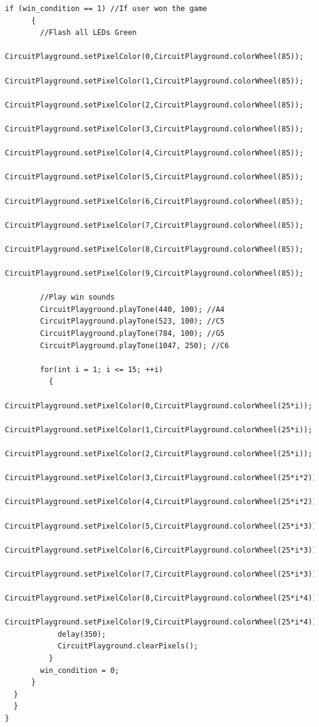 \documentclass[12pt]{article}
\begin{document}
\begin{lstlisting}[language=Arduino]
    if (win_condition == 1) //If user won the game
      {
        //Flash all LEDs Green
        CircuitPlayground.setPixelColor(0,CircuitPlayground.colorWheel(85));
        CircuitPlayground.setPixelColor(1,CircuitPlayground.colorWheel(85));
        CircuitPlayground.setPixelColor(2,CircuitPlayground.colorWheel(85));
        CircuitPlayground.setPixelColor(3,CircuitPlayground.colorWheel(85));
        CircuitPlayground.setPixelColor(4,CircuitPlayground.colorWheel(85));
        CircuitPlayground.setPixelColor(5,CircuitPlayground.colorWheel(85));
        CircuitPlayground.setPixelColor(6,CircuitPlayground.colorWheel(85));
        CircuitPlayground.setPixelColor(7,CircuitPlayground.colorWheel(85));
        CircuitPlayground.setPixelColor(8,CircuitPlayground.colorWheel(85));
        CircuitPlayground.setPixelColor(9,CircuitPlayground.colorWheel(85));

        //Play win sounds
        CircuitPlayground.playTone(440, 100); //A4
        CircuitPlayground.playTone(523, 100); //C5
        CircuitPlayground.playTone(784, 100); //G5
        CircuitPlayground.playTone(1047, 250); //C6

        for(int i = 1; i <= 15; ++i)
          {
            CircuitPlayground.setPixelColor(0,CircuitPlayground.colorWheel(25*i));
            CircuitPlayground.setPixelColor(1,CircuitPlayground.colorWheel(25*i));
            CircuitPlayground.setPixelColor(2,CircuitPlayground.colorWheel(25*i));
            CircuitPlayground.setPixelColor(3,CircuitPlayground.colorWheel(25*i*2));
            CircuitPlayground.setPixelColor(4,CircuitPlayground.colorWheel(25*i*2));
            CircuitPlayground.setPixelColor(5,CircuitPlayground.colorWheel(25*i*3));
            CircuitPlayground.setPixelColor(6,CircuitPlayground.colorWheel(25*i*3));
            CircuitPlayground.setPixelColor(7,CircuitPlayground.colorWheel(25*i*3));
            CircuitPlayground.setPixelColor(8,CircuitPlayground.colorWheel(25*i*4));
            CircuitPlayground.setPixelColor(9,CircuitPlayground.colorWheel(25*i*4));
            delay(350);
            CircuitPlayground.clearPixels();
          }
        win_condition = 0;
      }
  }
  }
}
\end{lstlisting}
\end{document}

